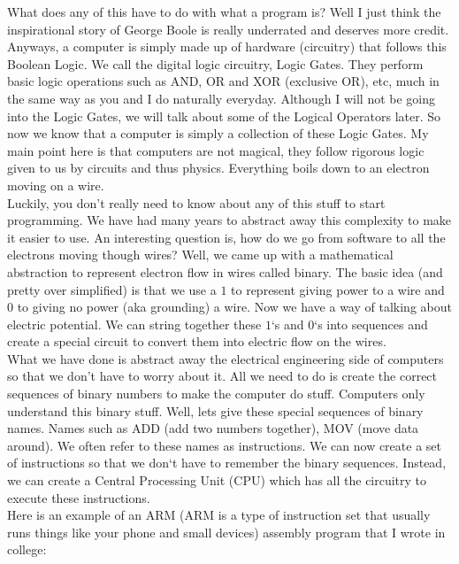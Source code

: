 \documentclass[11]{article}
\begin{document}
What does any of this have to do with what a program is? Well I just think the inspirational story of George Boole is really underrated and deserves more credit. Anyways, a computer is simply made up of hardware (circuitry) that follows this Boolean Logic. We call the digital logic circuitry, Logic Gates. They perform basic logic operations such as AND, OR and XOR (exclusive OR), etc, much in the same way as you and I do naturally everyday. Although I will not be going into the Logic Gates, we will talk about some of the Logical Operators later. So now we know that a computer is simply a collection of these Logic Gates. My main point here is that computers are not magical, they follow rigorous logic given to us by circuits and thus physics. Everything boils down to an electron moving on a wire.\\

Luckily, you don't really need to know about any of this stuff to start programming. We have had many years to abstract away this complexity to make it easier to use. An interesting question is, how do we go from software to all the electrons moving though wires? Well, we came up with a mathematical abstraction to represent electron flow in wires called binary. The basic idea (and pretty over simplified) is that we use a $1$ to represent giving power to a wire and $0$ to giving no power (aka grounding) a wire. Now we have a way of talking about electric potential. We can string together these $1$`s and $0$`s into sequences and create a special circuit to convert them into electric flow on the wires.\\

What we have done is abstract away the electrical engineering side of computers so that we don't have to worry about it. All we need to do is create the correct sequences of binary numbers to make the computer do stuff. Computers only understand this binary stuff. Well, lets give these special sequences of binary names. Names such as ADD (add two numbers together), MOV (move data around). We often refer to these names as instructions. We can now create a set of instructions so that we don`t have to remember the binary sequences. Instead, we can create a Central Processing Unit (CPU) which has all the circuitry to execute these instructions.\\

Here is an example of an ARM (ARM is a type of instruction set that usually runs things like your phone and small devices) assembly program that I wrote in college:
\end{document}

